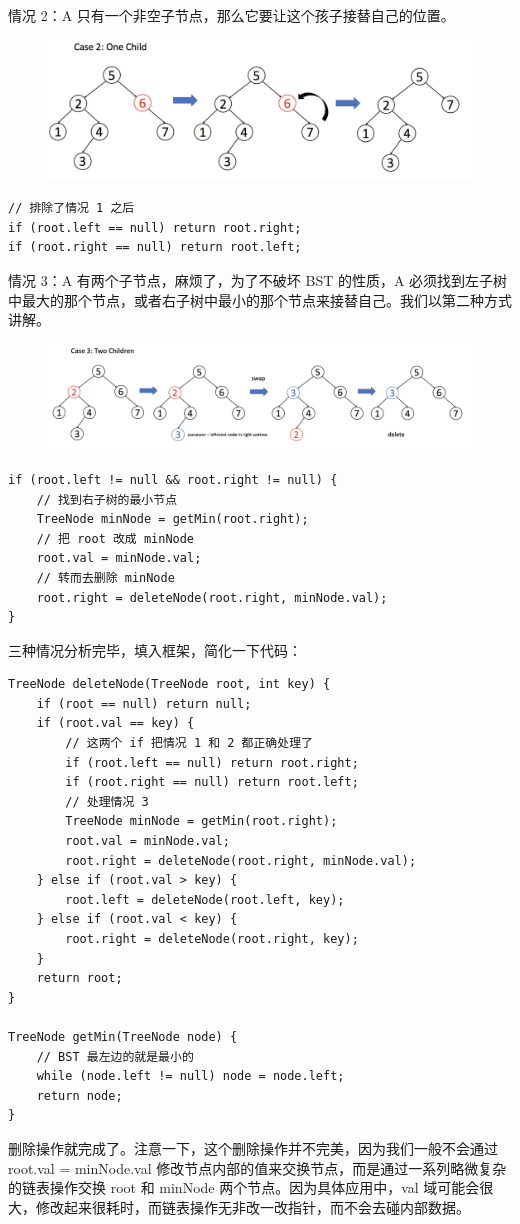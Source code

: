 \documentclass[12pt]{article}
\begin{document}
情况 2：A 只有一个非空子节点，那么它要让这个孩子接替自己的位置。
\begin{figure}[H]
    \centering
    \includegraphics[width=.8\textwidth]{fig/BST_Delete_2.png}
\end{figure}
\begin{lstlisting}
// 排除了情况 1 之后
if (root.left == null) return root.right;
if (root.right == null) return root.left;
\end{lstlisting}

情况 3：A 有两个子节点，麻烦了，为了不破坏 BST 的性质，A 必须找到左子树中最大的那个节点，或者右子树中最小的那个节点来接替自己。我们以第二种方式讲解。
\begin{figure}[H]
    \centering
    \includegraphics[width=1\textwidth]{fig/BST_Delete_3.png}
\end{figure}
\begin{lstlisting}
if (root.left != null && root.right != null) {
    // 找到右子树的最小节点
    TreeNode minNode = getMin(root.right);
    // 把 root 改成 minNode
    root.val = minNode.val;
    // 转而去删除 minNode
    root.right = deleteNode(root.right, minNode.val);
}
\end{lstlisting}

三种情况分析完毕，填入框架，简化一下代码：
\begin{lstlisting}
TreeNode deleteNode(TreeNode root, int key) {
    if (root == null) return null;
    if (root.val == key) {
        // 这两个 if 把情况 1 和 2 都正确处理了
        if (root.left == null) return root.right;
        if (root.right == null) return root.left;
        // 处理情况 3
        TreeNode minNode = getMin(root.right);
        root.val = minNode.val;
        root.right = deleteNode(root.right, minNode.val);
    } else if (root.val > key) {
        root.left = deleteNode(root.left, key);
    } else if (root.val < key) {
        root.right = deleteNode(root.right, key);
    }
    return root;
}

TreeNode getMin(TreeNode node) {
    // BST 最左边的就是最小的
    while (node.left != null) node = node.left;
    return node;
} 
\end{lstlisting}
删除操作就完成了。注意一下，这个删除操作并不完美，因为我们一般不会通过 root.val = minNode.val 修改节点内部的值来交换节点，而是通过一系列略微复杂的链表操作交换 root 和 minNode 两个节点。因为具体应用中，val 域可能会很大，修改起来很耗时，而链表操作无非改一改指针，而不会去碰内部数据。
\end{document}
